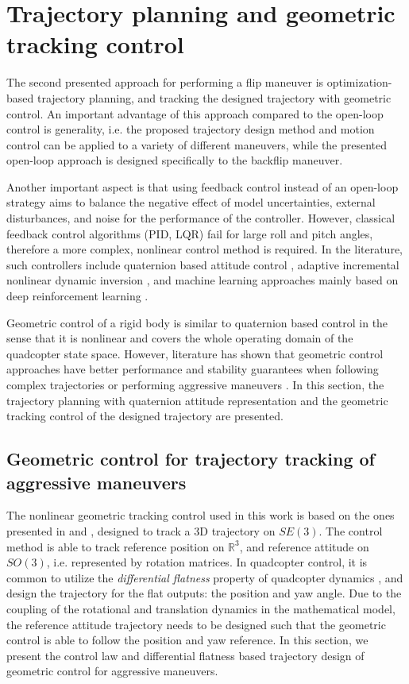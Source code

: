 \section{Trajectory planning and geometric tracking control}

The second presented approach for performing a flip maneuver is optimization-based trajectory planning, and tracking the designed trajectory with geometric control. An important advantage of this approach compared to the open-loop control is generality, i.e. the proposed trajectory design method and motion control can be applied to a variety of different maneuvers, while the presented open-loop approach is designed specifically to the backflip maneuver.

Another important aspect is that using feedback control instead of an open-loop strategy aims to balance the negative effect of model uncertainties, external disturbances, and noise for the performance of the controller. However, classical feedback control algorithms (PID, LQR) fail for large roll and pitch angles, therefore a more complex, nonlinear control method is required. In the literature, such controllers include quaternion based attitude control \cite{quaternion}, adaptive incremental nonlinear dynamic inversion \cite{indi2015}, and machine learning approaches mainly based on deep reinforcement learning \cite{drone-racing-deep-rl,deep_acrobatics, quadrotor-control-rl}. 

Geometric control of a rigid body is similar to quaternion based control in the sense that it is nonlinear and covers the whole operating domain of the quadcopter state space. However, literature has shown that geometric control approaches have better performance and stability guarantees when following complex trajectories or performing aggressive maneuvers \cite{lelemc2010, turpinkumar2011, mellinger2011}. In this section, the trajectory planning with quaternion attitude representation and the geometric tracking control of the designed trajectory are presented.

\subsection{Geometric control for trajectory tracking of aggressive maneuvers}
The nonlinear geometric tracking control used in this work is based on the ones presented in \cite{lelemc2010} and \cite{turpinkumar2011}, designed to track a 3D trajectory on $SE(3)$. The control method is able to track reference position on $\mathbb{R}^3$, and reference attitude on $SO(3)$, i.e. represented by rotation matrices. In quadcopter control, it is common to utilize the \textit{differential flatness} property of quadcopter dynamics \cite{flatness}, and design the trajectory for the flat outputs: the position and yaw angle. Due to the coupling of the rotational and translation dynamics in the mathematical model, the reference attitude trajectory needs to be designed such that the geometric control is able to follow the position and yaw reference. In this section, we present the control law and differential flatness based trajectory design of geometric control for aggressive maneuvers.

